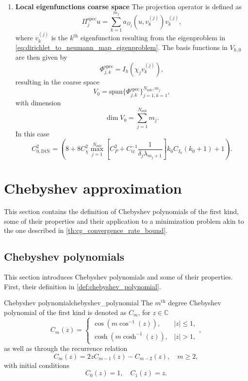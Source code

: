 \begin{enumerate}[label=\Roman*., ref=\textbf{ASM type \Roman* coarse space}]
  \item\label{ASM_coarse_space:local_eigenfunctions} \textbf{Local eigenfunctions coarse space} The projection operator is defined as
  \[
    \Pi_j^{\text{spec}}u = \sum_{k=1}^{m_j} a_{\Omega_j}(u, v^{(j)}_k) v^{(j)}_k,
  \]
  where $v^{(j)}_k$ is the $k^{\text{th}}$ eigenfunction resulting from the eigenproblem in \cref{eq:dirichlet_to_neumann_map_eigenproblem}. The basis functions in $V_{h,0}$ are then given by
  \[
    \Phi^{\text{spec}}_{j,k} = I_h(\chi_j v^{(j)}_k),
  \]
  resulting in the coarse space
  \[
    V_0 = \text{span}\{\Phi^{\text{spec}}_{j,k}\}_{j=1,k=1}^{N_{\text{sub}},m_j},
  \]
  with dimension
  \[
    \dim V_0 = \sum_{j=1}^{N_{\text{sub}}} m_j.
  \]
  In this case \cite[Theorem 5.17]{schwarz_methods_Dolean_2015}
  \begin{equation}
    C_{0,\text{DtN}}^{2} = \left(8 + 8 C_{\chi}^2 \max_{j=1}^{N_{\text{sub}}}\left[C_P^2 + C^{-1}_{\text{tr}}\frac{1}{\delta_j\lambda_{m_j +1}}\right]k_0 C_{I_h}(k_0 + 1) + 1\right).
    \label{eq:c0_local_eigenfunctions}
  \end{equation}
\end{enumerate}

\section{Chebyshev approximation}\label{sec:chebyshev_approximation}
This section contains the definition of Chebyshev polynomials of the first kind, some of their properties and their application to a minimization problem akin to the one described in \cref{th:cg_convergence_rate_bound}.

\subsection{Chebyshev polynomials}
This section introduces Chebyshev polynomials and some of their properties. First, their definition in \cref{def:chebyshev_polynomial}.
\begin{APPfancydef}{Chebyshev polynomial}{chebyshev_polynomial}
  The $m^{\text{th}}$ degree Chebyshev polynomial of the first kind is denoted as $C_m$, for $z\in\mathbb{C}$
  \[
    C_m(z) = \begin{cases}
      \cos(m \cos^{-1}(z)), & |z| \leq 1, \\
      \cosh(m \cosh^{-1}(z)), & |z| > 1,
    \end{cases},
  \]
  as well as through the recurrence relation
  \[
    C_m(z) = 2z C_{m-1}(z) - C_{m-2}(z), \quad m \geq 2,
  \]
  with initial conditions
  \[
    C_0(z) = 1, \quad C_1(z) = z.
  \]
\end{APPfancydef}

